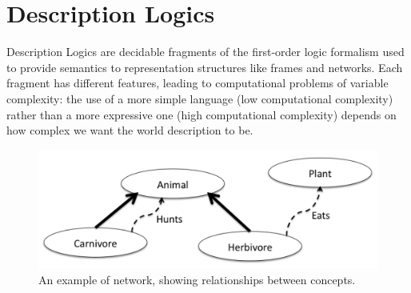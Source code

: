 \documentclass[a4paper, 11pt, oneside]{elsarticle}
\begin{document}


\newpage



\section{Description Logics}\label{dl}

Description Logics are decidable fragments of the first-order logic formalism used to provide semantics to representation structures like frames and networks.
Each fragment has different features, leading to computational problems of variable complexity: the use of a more simple language (low computational complexity) rather than a more expressive one (high computational complexity) depends on how complex we want the world description to be.


\begin{figure}[htp]
\centering
\includegraphics[scale=.33]{img/relationship_network.png}
\caption{An example of network, showing relationships between concepts.}
\label{rel_net}
\end{figure}
\end{document}
